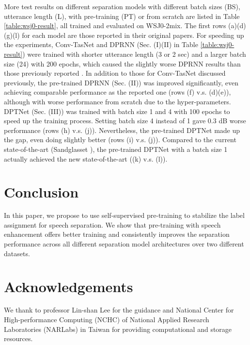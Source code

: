 \documentclass[a4paper]{article}
\begin{document}
More test results on different separation models with different batch sizes (BS), utterance length (L), with pre-training (PT) or from scratch are listed in Table \ref{table:wsj0-result}, all trained and evaluated on WSJ0-2mix.
The first rows (a)(d)(g)(l) for each model are those reported in their original papers.
For speeding up the experiments, Conv-TasNet and DPRNN (Sec. (I)(II) in Table \ref{table:wsj0-result}) were trained with shorter utterance length (3 or 2 sec) and a larger batch size (24) with 200 epochs, which caused the slightly worse DPRNN results than those previously reported \cite{luo2020dual}.
In addition to those for Conv-TasNet discussed previously, the pre-trained DPRNN (Sec. (II)) was improved significantly, even achieving comparable performance as the reported one (rows (f) v.s. (d)(e)), although with worse performance from scratch due to the hyper-parameters.
DPTNet (Sec. (III)) was trained with batch size 1 and 4 with 100 epochs to speed up the training process.
Setting batch size 4 instead of 1 gave 0.3 dB worse performance (rows (h) v.s. (j)).
Nevertheless, the pre-trained DPTNet made up the gap, even doing slightly better (rows (i) v.s. (j)).
Compared to the current state-of-the-art (Sandglasset \cite{lam2021sandglasset}), the pre-trained DPTNet with a batch size 1 actually achieved the new state-of-the-art ((k) v.s. (l)).


\section{Conclusion}
\label{sec:print}

In this paper, we propose to use self-supervised pre-training to stabilize the label assignment for speech separation.
We show that pre-training with speech enhancement offers better training and consistently improves the separation performance across all different separation model architectures over two different datasets.




\section{Acknowledgements}

We thank to professor Lin-shan Lee for the guidance and National Center for High-performance Computing (NCHC) of National Applied Research Laboratories (NARLabs) in Taiwan for providing computational and storage resources.
\end{document}
